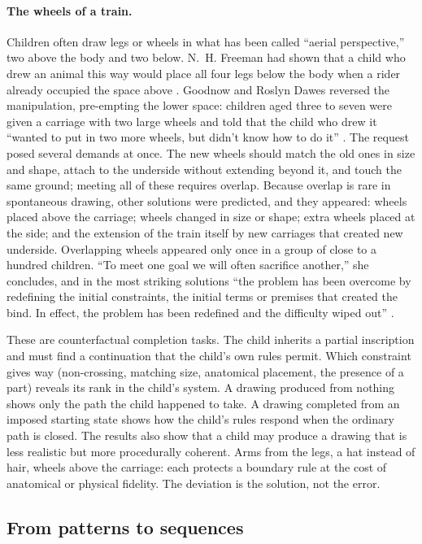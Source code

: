 \documentclass[11pt]{article}
\theoremstyle{remark}
\begin{document}
\paragraph{The wheels of a train.} Children often draw legs or wheels in what has been called ``aerial perspective,'' two above the body and two below. N.~H. Freeman had shown that a child who drew an animal this way would place all four legs below the body when a rider already occupied the space above \cite[pp.~54--55]{goodnow1977}. Goodnow and Roslyn Dawes reversed the manipulation, pre-empting the lower space: children aged three to seven were given a carriage with two large wheels and told that the child who drew it ``wanted to put in two more wheels, but didn't know how to do it'' \cite[p.~55]{goodnow1977}. The request posed several demands at once. The new wheels should match the old ones in size and shape, attach to the underside without extending beyond it, and touch the same ground; meeting all of these requires overlap. Because overlap is rare in spontaneous drawing, other solutions were predicted, and they appeared: wheels placed above the carriage; wheels changed in size or shape; extra wheels placed at the side; and the extension of the train itself by new carriages that created new underside. Overlapping wheels appeared only once in a group of close to a hundred children. ``To meet one goal we will often sacrifice another,'' she concludes, and in the most striking solutions ``the problem has been overcome by redefining the initial constraints, the initial terms or premises that created the bind. In effect, the problem has been redefined and the difficulty wiped out'' \cite[pp.~55--56]{goodnow1977}.

These are counterfactual completion tasks. The child inherits a partial inscription and must find a continuation that the child's own rules permit. Which constraint gives way (non-crossing, matching size, anatomical placement, the presence of a part) reveals its rank in the child's system. A drawing produced from nothing shows only the path the child happened to take. A drawing completed from an imposed starting state shows how the child's rules respond when the ordinary path is closed. The results also show that a child may produce a drawing that is less realistic but more procedurally coherent. Arms from the legs, a hat instead of hair, wheels above the carriage: each protects a boundary rule at the cost of anatomical or physical fidelity. The deviation is the solution, not the error.

\subsection{From patterns to sequences}
\end{document}
